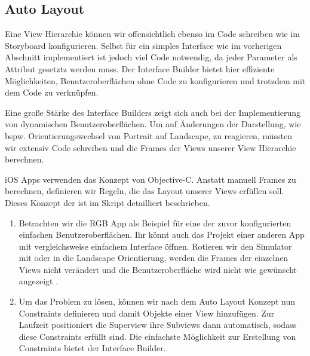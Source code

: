 \documentclass[parskip=half, final]{scrreprt}
\begin{document}
\begin{lecture}


\section{Auto Layout}

\mvcindicatorview

Eine View Hierarchie können wir offensichtlich ebenso im Code schreiben wie im Storyboard konfigurieren. Selbst für ein simples Interface wie im vorherigen Abschnitt implementiert ist jedoch viel Code notwendig, da jeder Parameter als Attribut gesetztz werden muss. Der Interface Builder bietet hier effiziente Möglichkeiten, Benutzeroberflächen ohne Code zu konfigurieren und trotzdem mit dem Code zu verknüpfen.

Eine große Stärke des Interface Builders zeigt sich auch bei der Implementierung von dynamischen Benutzeroberflächen. Um auf Änderungen der Darstellung, wie bspw. Orientierungswechsel von Portrait auf Landscape, zu reagieren, müssten wir extensiv Code schreiben und die Frames der Views unserer View Hierarchie berechnen.

iOS Apps verwenden das  Konzept von Objective-C. Anstatt manuell Frames zu berechnen, definieren wir Regeln, die das Layout unserer Views erfüllen soll. Dieses Konzept der  ist im Skript detailliert beschrieben.


\begin{enumerate}

\item Betrachten wir die RGB App als Beispiel für eine der zuvor konfigurierten einfachen Benutzeroberflächen. Ihr könnt auch das Projekt einer anderen App mit vergleichsweise einfachem Interface öffnen. Rotieren wir den Simulator mit \keys{\cmdkey+\arrowkeyright} oder \keys{\cmdkey+\arrowkeyleft} in die Landscape Orientierung, werden die Frames der einzelnen Views nicht verändert und die Benutzeroberfläche wird nicht wie gewünscht angezeigt .


\item Um das Problem zu lösen, können wir nach dem Auto Layout Konzept nun Constraints definieren und damit  Objekte einer View hinzufügen. Zur Laufzeit positioniert die Superview ihre Subviews dann automatisch, sodass diese Constraints erfüllt sind. Die einfachste Möglichkeit zur Erstellung von Constraints bietet der Interface Builder.


\end{enumerate}
\end{lecture}
\end{document}
